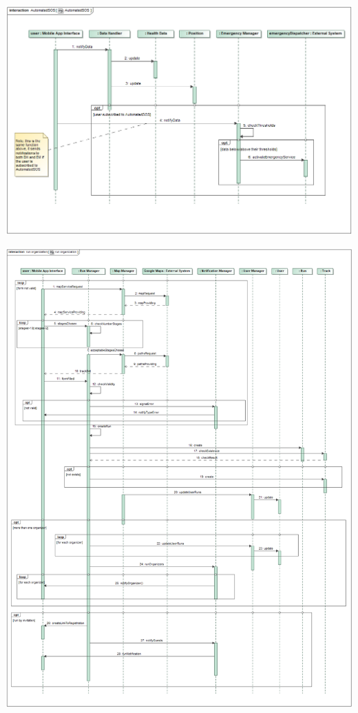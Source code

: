 \begin{center}
\includegraphics[scale=0.4]{sections/diagrams/AutomatedSOS}
\end{center}

\begin{center}
\includegraphics[scale=0.35]{sections/diagrams/run_organization}
\end{center}

